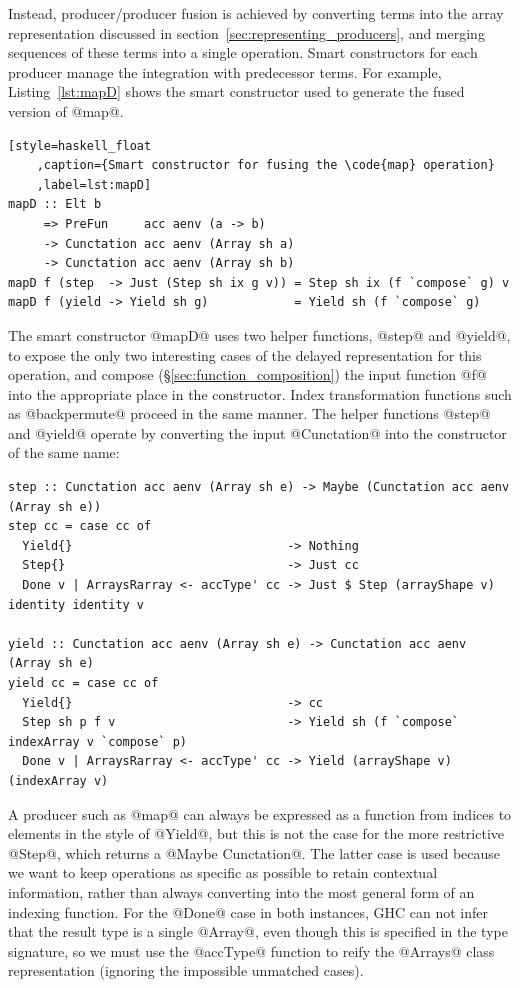 Instead, producer/producer fusion is achieved by converting terms into the array
representation discussed in section~\ref{sec:representing_producers}, and
merging sequences of these terms into a single operation. Smart constructors for
each producer manage the integration with predecessor terms. For example,
Listing~\ref{lst:mapD} shows the smart constructor used to generate the fused
version of @map@.

\begin{lstlisting}[style=haskell_float
    ,caption={Smart constructor for fusing the \code{map} operation}
    ,label=lst:mapD]
mapD :: Elt b
     => PreFun     acc aenv (a -> b)
     -> Cunctation acc aenv (Array sh a)
     -> Cunctation acc aenv (Array sh b)
mapD f (step  -> Just (Step sh ix g v)) = Step sh ix (f `compose` g) v
mapD f (yield -> Yield sh g)            = Yield sh (f `compose` g)
\end{lstlisting}

The smart constructor @mapD@ uses two helper functions, @step@ and @yield@, to
expose the only two interesting cases of the delayed representation for this
operation, and compose (\S\ref{sec:function_composition}) the input function @f@
into the appropriate place in the constructor. Index transformation functions
such as @backpermute@ proceed in the same manner. The helper functions @step@
and @yield@ operate by converting the input @Cunctation@ into the constructor of
the same name:
%
\begin{lstlisting}[style=haskell]
step :: Cunctation acc aenv (Array sh e) -> Maybe (Cunctation acc aenv (Array sh e))
step cc = case cc of
  Yield{}                              -> Nothing
  Step{}                               -> Just cc
  Done v | ArraysRarray <- accType' cc -> Just $ Step (arrayShape v) identity identity v

yield :: Cunctation acc aenv (Array sh e) -> Cunctation acc aenv (Array sh e)
yield cc = case cc of
  Yield{}                              -> cc
  Step sh p f v                        -> Yield sh (f `compose` indexArray v `compose` p)
  Done v | ArraysRarray <- accType' cc -> Yield (arrayShape v) (indexArray v)
\end{lstlisting}

A producer such as @map@ can always be expressed as a function from indices to
elements in the style of @Yield@, but this is not the case for the more
restrictive @Step@, which returns a @Maybe Cunctation@. The latter case is used
because we want to keep operations as specific as possible to retain contextual
information, rather than always converting into the most general form of an
indexing function. For the @Done@ case in both instances, GHC can not infer that
the result type is a single @Array@, even though this is specified in the type
signature, so we must use the @accType@ function to reify the @Arrays@ class
representation (ignoring the impossible unmatched cases).

